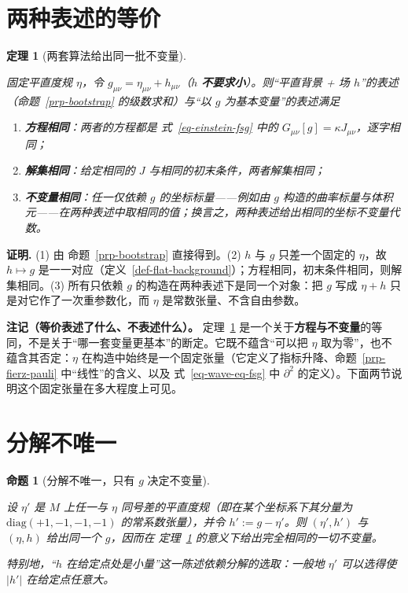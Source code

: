 \documentclass[
  chinese,
  a4paper,
  UTF8,
  12pt,
  oneside,
  openany]{ctexbook}
\providecommand{\tightlist}{%
  \setlength{\itemsep}{0pt}\setlength{\parskip}{0pt}}
\theoremstyle{plain}
\newtheorem{theorem}{定理}[chapter]
\theoremstyle{plain}
\theoremstyle{plain}
\newtheorem{proposition}{命题}[chapter]
\theoremstyle{definition}
\theoremstyle{plain}
\theoremstyle{plain}
\theoremstyle{remark}
\begin{document}
\section{两种表述的等价}\label{sec-fsg-equivalence}

\begin{theorem}[两套算法给出同一批不变量]\protect\hypertarget{thm-equivalence}{}\label{thm-equivalence}

固定平直度规 \(\eta\)，令 \(g_{\mu\nu}=\eta_{\mu\nu}+h_{\mu\nu}\)（\(h\)
\textbf{不要求小}）。则``平直背景 + 场
\(h\)''的表述（命题~\ref{prp-bootstrap} 的级数求和）与``以 \(g\)
为基本变量''的表述满足

\begin{enumerate}
\def\labelenumi{\arabic{enumi}.}
\tightlist
\item
  \textbf{方程相同}：两者的方程都是 式~\ref{eq-einstein-fsg} 中的
  \(G_{\mu\nu}[g]=\kappa J_{\mu\nu}\)，逐字相同；
\item
  \textbf{解集相同}：给定相同的 \(J\) 与相同的初末条件，两者解集相同；
\item
  \textbf{不变量相同}：任一仅依赖 \(g\) 的坐标标量------例如由 \(g\)
  构造的曲率标量与体积元------在两种表述中取相同的值；换言之，两种表述给出相同的坐标不变量代数。
\end{enumerate}

\end{theorem}

\textbf{证明.} (1) 由 命题~\ref{prp-bootstrap} 直接得到。(2) \(h\) 与
\(g\) 只差一个固定的 \(\eta\)，故 \(h\mapsto g\)
是一一对应（定义~\ref{def-flat-background}）；方程相同，初末条件相同，则解集相同。(3)
所有只依赖 \(g\) 的构造在两种表述下是同一个对象：把 \(g\) 写成
\(\eta+h\) 只是对它作了一次重参数化，而 \(\eta\)
是常数张量、不含自由参数。

\textbf{注记（等价表述了什么、不表述什么）。} 定理~\ref{thm-equivalence}
是一个关于\textbf{方程与不变量}的等同，不是关于``哪一套变量更基本''的断定。它既不蕴含``可以把
\(\eta\) 取为零''，也不蕴含其否定：\(\eta\)
在构造中始终是一个固定张量（它定义了指标升降、命题~\ref{prp-fierz-pauli}
中``线性''的含义、以及 式~\ref{eq-wave-eq-fsg} 中 \(\partial^{2}\)
的定义）。下面两节说明这个固定张量在多大程度上可见。

\section{分解不唯一}\label{sec-fsg-flatness}

\begin{proposition}[分解不唯一，只有 \(g\)
决定不变量]\protect\hypertarget{prp-split-not-unique}{}\label{prp-split-not-unique}

设 \(\eta'\) 是 \(M\) 上任一与 \(\eta\)
同号差的平直度规（即在某个坐标系下其分量为
\(\mathrm{diag}(+1,-1,-1,-1)\) 的常系数张量），并令 \(h':=g-\eta'\)。则
\((\eta',h')\) 与 \((\eta,h)\) 给出同一个 \(g\)，因而在
定理~\ref{thm-equivalence} 的意义下给出完全相同的一切不变量。

特别地，``\(h\) 在给定点处是小量''这一陈述依赖分解的选取：一般地
\(\eta'\) 可以选得使 \(|h'|\) 在给定点任意大。

\end{proposition}
\end{document}
